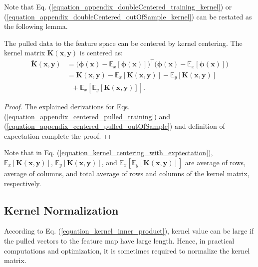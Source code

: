 \documentclass[lang=cn,10pt]{gorgeousnbook}
\numberwithin{equation}{section}%
\numberwithin{figure}{section}%
\begin{document}
Note that Eq. (\ref{equation_appendix_doubleCentered_training_kernel}) or  (\ref{equation_appendix_doubleCentered_outOfSample_kernel}) can be restated as the following lemma.
\begin{lemma}\label{lemma_kernel_centering}
The pulled data to the feature space can be centered by kernel centering. The kernel matrix $\boldsymbol{K}(\boldsymbol{x},\boldsymbol{y})$ is centered as:
\begin{align}
\breve{\boldsymbol{K}}(\boldsymbol{x},\boldsymbol{y}) &= \big(\boldsymbol{\phi}(\boldsymbol{x}) - \mathbb{E}_x[\boldsymbol{\phi}(\boldsymbol{x})]\big)^\top \big(\boldsymbol{\phi}(\boldsymbol{x}) - \mathbb{E}_x[\boldsymbol{\phi}(\boldsymbol{x})]\big) \nonumber \\
&= \boldsymbol{K}(\boldsymbol{x}, \boldsymbol{y}) - \mathbb{E}_x[\boldsymbol{K}(\boldsymbol{x}, \boldsymbol{y})] - \mathbb{E}_y[\boldsymbol{K}(\boldsymbol{x}, \boldsymbol{y})] \nonumber \\
&~~~ + \mathbb{E}_x[\mathbb{E}_y[\boldsymbol{K}(\boldsymbol{x}, \boldsymbol{y})]]. \label{equation_kernel_centering_with_exptectation}
\end{align}
\end{lemma}
\begin{proof}
The explained derivations for Eqs. (\ref{equation_appendix_centered_pulled_training}) and (\ref{equation_appendix_centered_pulled_outOfSample}) and definition of expectation complete the proof.
\end{proof}
Note that in Eq. (\ref{equation_kernel_centering_with_exptectation}), $\mathbb{E}_x[\boldsymbol{K}(\boldsymbol{x}, \boldsymbol{y})]$, $\mathbb{E}_y[\boldsymbol{K}(\boldsymbol{x}, \boldsymbol{y})]$, and $\mathbb{E}_x[\mathbb{E}_y[\boldsymbol{K}(\boldsymbol{x}, \boldsymbol{y})]]$ are average of rows, average of columns, and total average of rows and columns of the kernel matrix, respectively.

\subsection{Kernel Normalization}

According to Eq. (\ref{equation_kernel_inner_product}), kernel value can be large if the pulled vectors to the feature map have large length. Hence, in practical computations and optimization, it is sometimes required to normalize the kernel matrix. 
\end{document}
